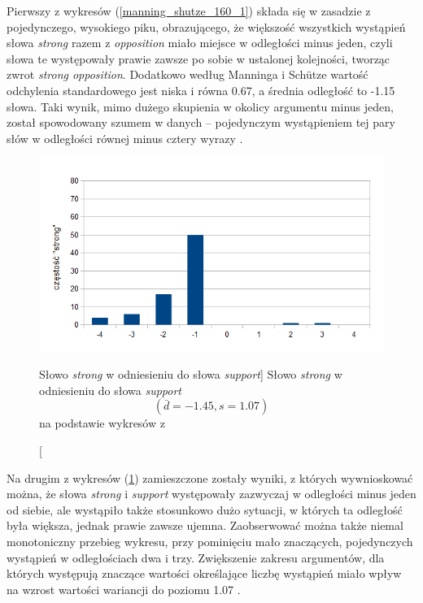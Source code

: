 \par
Pierwszy z wykresów (\ref{manning_shutze_160_1}) składa się w zasadzie z pojedynczego, wysokiego piku, obrazującego, że większość wszystkich wystąpień słowa \emph{strong} razem z \emph{opposition} miało miejsce w odległości minus jeden, czyli słowa te występowały prawie zawsze po sobie w ustalonej kolejności, tworząc zwrot \emph{strong opposition}.
Dodatkowo według Manninga i Schütze wartość odchylenia standardowego jest niska i równa 0.67, a średnia odległość to -1.15 słowa.
Taki wynik, mimo dużego skupienia w okolicy argumentu minus jeden, został spowodowany szumem w danych -- pojedynczym wystąpieniem tej pary słów w odległości równej minus cztery wyrazy \cite[str. 159]{mit}.

\begin{figure}[h!]
\centering 
\includegraphics{charts/manning_shutze_160_2} 
\caption
	[Słowo \emph{strong} w odniesieniu do słowa \emph{support}]
	{
		Słowo \emph{strong} w odniesieniu do słowa \emph{support} 
		\begin{displaymath}
			(\bar{d} = -1.45, s = 1.07)
		\end{displaymath}	
		na podstawie wykresów z \cite[str. 160]{mit}
	}
\label{manning_shutze_160_2}
\end{figure}

\par
Na drugim z wykresów (\ref{manning_shutze_160_2}) zamieszczone zostały wyniki, z których wywnioskować można, że słowa \emph{strong} i \emph{support} występowały zazwyczaj w odległości minus jeden od siebie, ale wystąpiło także stosunkowo dużo sytuacji, w których ta odległość była większa, jednak prawie zawsze ujemna.
Zaobserwować można także niemal monotoniczny przebieg wykresu, przy pominięciu mało znaczących, pojedynczych wystąpień w odległościach dwa i trzy.
Zwiększenie zakresu argumentów, dla których występują znaczące wartości określające liczbę wystąpień miało wpływ na wzrost wartości wariancji do poziomu 1.07 \cite[str. 161]{mit}.

